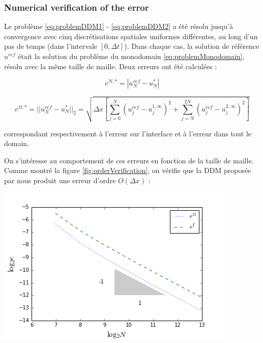 \subsubsection{Numerical verification of the error}

\indent Le problème \eqref{eq:problemDDM1} - \eqref{eq:problemDDM2} a été résolu jusqu'à convergence avec cinq discrétisations spatiales uniformes différentes, au long d'un pas de temps (dans l'intervale $[0,\Delta t]$). Dans chaque cas, la solution de référence $u^{ref}$ était la solution du problème du monodomain \eqref{eq:problemMonodomain}, résolu avec la même taille de maille. Deux erreurs ont été calculées :

\begin{equation*}
	e^{N,*} = |u^{ref}_N - u^{*}_N|
\end{equation*}

\begin{equation}
	\label{eq:errorDDM}
	e^{\Omega,*} = ||u^{ref}_N - u^{*}_N||_2 = \sqrt{\Delta x \left[ \sum_{j=0}^N{(u^{ref}_j - u^{1,\infty}_j)^2 } + \sum_{j=N}^{2N}{(u^{ref}_j - u^{2,\infty}_j)^2 } \right] }
\end{equation}

\noindent correspondant respectivement à l'erreur sur l'interface et à l'erreur dans tout le domain.

\indent On s'intéresse au comportement de ces erreurs en fonction de la taille de maille. Comme montré la figure \ref{fig:orderVerification}, on vérifie que la DDM proposée par nous produit une erreur d'ordre $O(\Delta x)$  :

\begingroup
\begin{center}
	\includegraphics[scale=.5]{figures/convergenceVerificationCorrectN.png}
\end{center}
\endgroup

